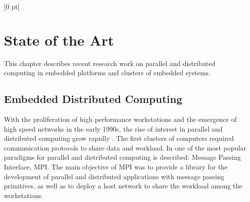 \titlespacing{\chapter}{0 pt}{30 pt}{50 pt}[0 pt]
\titleformat{\section}{\Large\bfseries}{\thesection}{0 pt}{\hspace{30 pt}}
\titleformat{\subsection}{\large\bfseries}{\thesubsection}{0 pt}{\hspace{30 pt}}
\pagestyle{fancy}
\fancyhead[LO,LE]{\footnotesize\textit{\leftmark}}
\fancyhead[RO,RE]{\thepage}
\fancyfoot[CO,CE]{}

\chapter{State of the Art} %

\normalsize

\noindent

This chapter describes recent research work on parallel and distributed 
computing in embedded platforms and clusters of embedded systems.

\section{Embedded Distributed Computing}

With the proliferation of high performance workstations and the emergence of
high speed networks in the early 1990s, the rise of interest in parallel and
distributed computing grow rapidly . The first clusters of computers 
required communication protocols to share data and workload. In
\cite{Salim} one of the most popular paradigms for parallel and distributed
computing is described: Message Passing Interface, MPI. The main
objective of MPI was to provide a library for the development of parallel and
distributed applications with message passing primitives, as well as to deploy
a host network to share the workload among the workstations.


